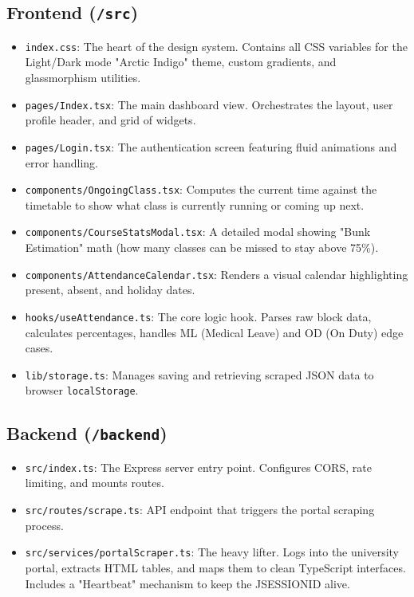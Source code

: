 \documentclass[11pt,a4paper]{article}
\begin{document}
\subsection{Frontend (\texttt{/src})}
\begin{itemize}
    \item \texttt{index.css}: The heart of the design system. Contains all CSS variables for the Light/Dark mode "Arctic Indigo" theme, custom gradients, and glassmorphism utilities.
    \item \texttt{pages/Index.tsx}: The main dashboard view. Orchestrates the layout, user profile header, and grid of widgets.
    \item \texttt{pages/Login.tsx}: The authentication screen featuring fluid animations and error handling.
    \item \texttt{components/OngoingClass.tsx}: Computes the current time against the timetable to show what class is currently running or coming up next.
    \item \texttt{components/CourseStatsModal.tsx}: A detailed modal showing "Bunk Estimation" math (how many classes can be missed to stay above 75\%).
    \item \texttt{components/AttendanceCalendar.tsx}: Renders a visual calendar highlighting present, absent, and holiday dates.
    \item \texttt{hooks/useAttendance.ts}: The core logic hook. Parses raw block data, calculates percentages, handles ML (Medical Leave) and OD (On Duty) edge cases.
    \item \texttt{lib/storage.ts}: Manages saving and retrieving scraped JSON data to browser \texttt{localStorage}.
\end{itemize}

\subsection{Backend (\texttt{/backend})}
\begin{itemize}
    \item \texttt{src/index.ts}: The Express server entry point. Configures CORS, rate limiting, and mounts routes.
    \item \texttt{src/routes/scrape.ts}: API endpoint that triggers the portal scraping process.
    \item \texttt{src/services/portalScraper.ts}: The heavy lifter. Logs into the university portal, extracts HTML tables, and maps them to clean TypeScript interfaces. Includes a "Heartbeat" mechanism to keep the JSESSIONID alive.
\end{itemize}
\end{document}
